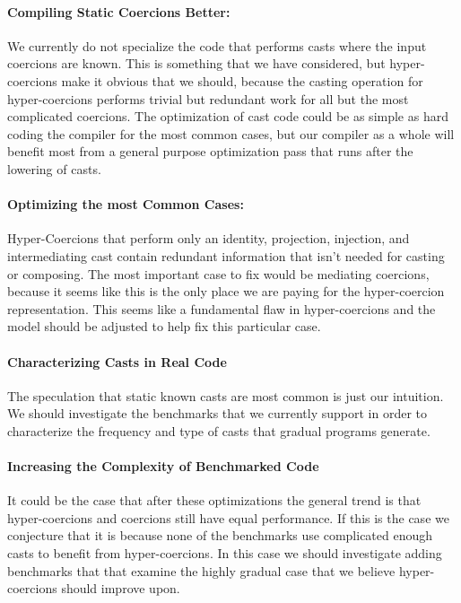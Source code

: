 \documentclass[acmtog, authorversion, acmlarge]{acmart}
\begin{document}
\paragraph{Compiling Static Coercions Better:}
We currently do not specialize the code that performs
casts where the input coercions are known. This is
something that we have considered,
but hyper-coercions make it obvious that we should,
because the casting operation for hyper-coercions
performs trivial but redundant work for all but
the most complicated coercions. The optimization
of cast code could be as simple as
hard coding the compiler for the most common
cases, but our compiler as a whole will benefit
most from a general purpose optimization pass
that runs after the lowering of casts.

\paragraph{Optimizing the most Common Cases:}
Hyper-Coercions that perform only an identity,
projection, injection, and intermediating cast
contain redundant information that isn't needed
for casting or composing. The most important case
to fix would be mediating coercions, because it
seems like this is the only place we are paying
for the hyper-coercion representation. This seems
like a fundamental flaw in hyper-coercions and
the model should be adjusted to help fix this
particular case. 

\paragraph{Characterizing Casts in Real Code}
The speculation that static known casts are most
common is just our intuition. We should investigate
the benchmarks that we currently support in order
to characterize the frequency and type of casts
that gradual programs generate. 

\paragraph{Increasing the Complexity of Benchmarked Code}
It could be the case that after these optimizations
the general trend is that hyper-coercions and coercions
still have equal performance. If this is the case we conjecture
that it is because none of the benchmarks use
complicated enough casts to benefit from hyper-coercions.
In this case we should investigate adding benchmarks that
that examine the highly gradual case that we believe hyper-coercions
should improve upon.



\end{document}
